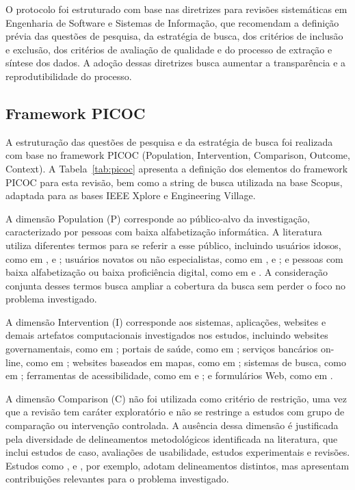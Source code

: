 O protocolo foi estruturado com base nas diretrizes para revisões sistemáticas em Engenharia de Software e Sistemas de Informação, que recomendam a definição prévia das questões de pesquisa, da estratégia de busca, dos critérios de inclusão e exclusão, dos critérios de avaliação de qualidade e do processo de extração e síntese dos dados. A adoção dessas diretrizes busca aumentar a transparência e a reprodutibilidade do processo.

\subsection{Framework PICOC}

\label{sec:picoc}

A estruturação das questões de pesquisa e da estratégia de busca foi realizada com base no framework PICOC (Population, Intervention, Comparison, Outcome, Context). A Tabela~\ref{tab:picoc} apresenta a definição dos elementos do framework PICOC para esta revisão, bem como a string de busca utilizada na base Scopus, adaptada para as bases IEEE Xplore e Engineering Village.

A dimensão Population (P) corresponde ao público-alvo da investigação, caracterizado por pessoas com baixa alfabetização informática. A literatura utiliza diferentes termos para se referir a esse público, incluindo usuários idosos, como em \cite{kurniawan2005research}, \cite{dombrovskaia2021guideline} e \cite{sun2010preliminary}; usuários novatos ou não especialistas, como em \cite{nosseir2011novice}, \cite{cowan2011exploring} e \cite{kabassi2004personalised}; e pessoas com baixa alfabetização ou baixa proficiência digital, como em \cite{filgueiras2009recoverability} e \cite{barron2013feasibility}. A consideração conjunta desses termos busca ampliar a cobertura da busca sem perder o foco no problema investigado.

A dimensão Intervention (I) corresponde aos sistemas, aplicações, websites e demais artefatos computacionais investigados nos estudos, incluindo websites governamentais, como em \cite{health_problem_solving}; portais de saúde, como em \cite{barron2013feasibility}; serviços bancários on-line, como em \cite{gatsou2017seniors}; websites baseados em mapas, como em \cite{xie2010usability}; sistemas de busca, como em \cite{shafiq2018assessment}; ferramentas de acessibilidade, como em \cite{kusumaningayu2017web} e \cite{gonzalez2025augmenting}; e formulários Web, como em \cite{halbach2009framework}.

A dimensão Comparison (C) não foi utilizada como critério de restrição, uma vez que a revisão tem caráter exploratório e não se restringe a estudos com grupo de comparação ou intervenção controlada. A ausência dessa dimensão é justificada pela diversidade de delineamentos metodológicos identificada na literatura, que inclui estudos de caso, avaliações de usabilidade, estudos experimentais e revisões. Estudos como \cite{sharit2008information}, \cite{cowan2011exploring} e \cite{allah2021empathy}, por exemplo, adotam delineamentos distintos, mas apresentam contribuições relevantes para o problema investigado.

